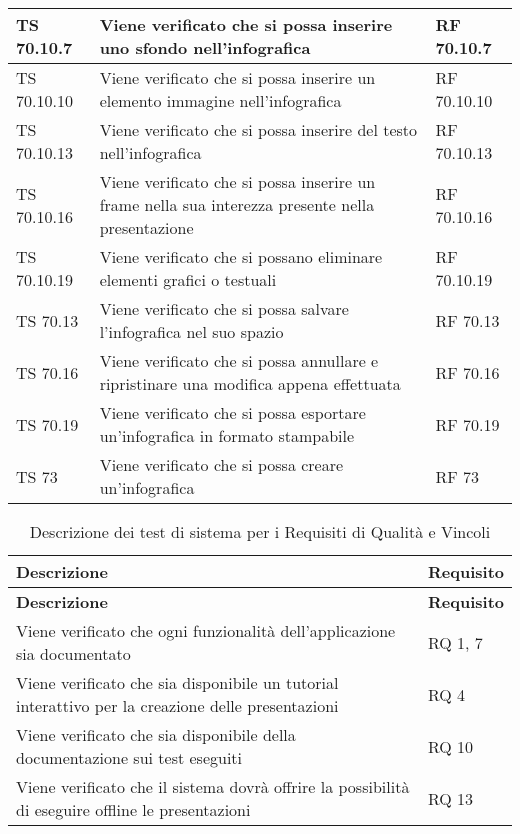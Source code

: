 {{\begin{longtable} [c]{| p{3cm} | p{6cm} |p{3cm}|}
			\hline
			TS 70.10.7 & Viene verificato che si possa inserire uno sfondo nell'infografica\ped{g} & RF 70.10.7\\
			\hline
			TS 70.10.10 & Viene verificato che si possa inserire un elemento immagine nell'infografica\ped{g} & RF 70.10.10\\
			\hline
			TS 70.10.13 & Viene verificato che si possa inserire del testo nell'infografica\ped{g} & RF 70.10.13\\
			\hline
			TS 70.10.16 & Viene verificato che si possa inserire un frame\ped{g} nella sua interezza presente nella presentazione & RF 70.10.16\\
			\hline
			TS 70.10.19 & Viene verificato che si possano eliminare elementi grafici o testuali & RF 70.10.19\\
			\hline
			TS 70.13 & Viene verificato che si possa salvare l'infografica\ped{g} nel suo spazio & RF 70.13\\
			\hline
			TS 70.16 & Viene verificato che si possa annullare e ripristinare una modifica appena effettuata & RF 70.16\\
			\hline
			TS 70.19 & Viene verificato che si possa esportare un'infografica\ped{g} in formato stampabile & RF 70.19\\
			\hline
			TS 73 & Viene verificato che si possa creare un'infografica\ped{g} & RF 73\\
			\hline
\end{longtable}

		\renewcommand*{\arraystretch}{1.4}
		\begin{longtable} [c]{| p{7cm} |p{4cm}|}
			\caption{
			Descrizione dei test di sistema
			per i Requisiti di Qualità e Vincoli \label{tab:verReqQualVinc}}\\
			 \hline
			 \textbf{Descrizione} & \textbf{Requisito} \\
			 \hline
			 \endfirsthead
			 \hline
			 \textbf{Descrizione} & \textbf{Requisito} \\
			 \hline
			\endhead
			 \hline
			 \endfoot
			 \hline
			 \endlastfoot
			Viene verificato che ogni funzionalità dell'applicazione sia documentato & RQ 1, 7\\
			\hline
			Viene verificato che sia disponibile un tutorial interattivo per la creazione delle presentazioni & RQ 4\\
			\hline
			Viene verificato che sia disponibile della documentazione sui test eseguiti & RQ 10\\
			\hline
			Viene verificato che il sistema dovrà offrire la possibilità di eseguire offline le presentazioni & RQ 13\\
\end{longtable}
}
}
